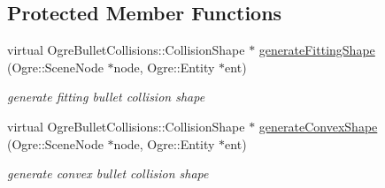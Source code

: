 \subsection*{Protected Member Functions}
\begin{DoxyCompactItemize}
\item 
virtual Ogre\+Bullet\+Collisions\+::\+Collision\+Shape $\ast$ \hyperlink{class_n_c_t_u_1_1_obstacle_a226dbf997ccf224cafdb612c3821e944}{generate\+Fitting\+Shape} (Ogre\+::\+Scene\+Node $\ast$node, Ogre\+::\+Entity $\ast$ent)\hypertarget{class_n_c_t_u_1_1_obstacle_a226dbf997ccf224cafdb612c3821e944}{}\label{class_n_c_t_u_1_1_obstacle_a226dbf997ccf224cafdb612c3821e944}

\begin{DoxyCompactList}\small\item\em generate fitting bullet collision shape \end{DoxyCompactList}\item 
virtual Ogre\+Bullet\+Collisions\+::\+Collision\+Shape $\ast$ \hyperlink{class_n_c_t_u_1_1_obstacle_a25a4697df6bd0fe7c45542f443d44578}{generate\+Convex\+Shape} (Ogre\+::\+Scene\+Node $\ast$node, Ogre\+::\+Entity $\ast$ent)\hypertarget{class_n_c_t_u_1_1_obstacle_a25a4697df6bd0fe7c45542f443d44578}{}\label{class_n_c_t_u_1_1_obstacle_a25a4697df6bd0fe7c45542f443d44578}

\begin{DoxyCompactList}\small\item\em generate convex bullet collision shape \end{DoxyCompactList}\end{DoxyCompactItemize}
